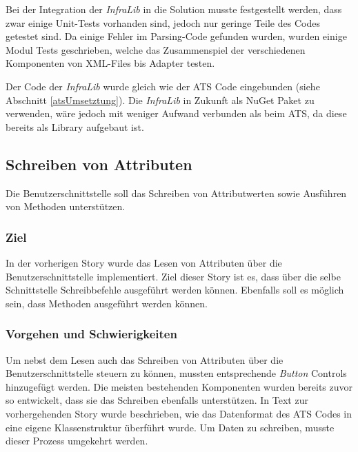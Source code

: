 Bei der Integration der \textit{InfraLib} in die Solution musste festgestellt werden, dass zwar einige Unit-Tests vorhanden sind, jedoch nur geringe Teile des Codes getestet sind.
Da einige Fehler im Parsing-Code gefunden wurden, wurden einige Modul Tests geschrieben, welche das Zusammenspiel der verschiedenen Komponenten von XML-Files bis Adapter testen.

Der Code der \textit{InfraLib} wurde gleich wie der \ac{ATS} Code eingebunden (siehe Abschnitt \ref{atsUmsetztung}).
Die \textit{InfraLib} in Zukunft als NuGet Paket zu verwenden, wäre jedoch mit weniger Aufwand verbunden als beim \ac{ATS}, da diese bereits als Library aufgebaut ist.

\subsection{Schreiben von Attributen}
\dq Die Benutzerschnittstelle soll das Schreiben von Attributwerten sowie Ausführen von Methoden unterstützen.\dq

\subsubsection{Ziel}
In der vorherigen Story wurde das Lesen von Attributen über die Benutzerschnittstelle implementiert.
Ziel dieser Story ist es, dass über die selbe Schnittstelle Schreibbefehle ausgeführt werden können.
Ebenfalls soll es möglich sein, dass Methoden ausgeführt werden können.

\subsubsection{Vorgehen und Schwierigkeiten}
Um nebst dem Lesen auch das Schreiben von Attributen über die Benutzerschnittstelle steuern zu können, mussten entsprechende \textit{Button} Controls hinzugefügt werden.
Die meisten bestehenden Komponenten wurden bereits zuvor so entwickelt, dass sie das Schreiben ebenfalls unterstützen.
In Text zur vorhergehenden Story wurde beschrieben, wie das Datenformat des \ac{ATS} Codes in eine eigene Klassenstruktur überführt wurde.
Um Daten zu schreiben, musste dieser Prozess umgekehrt werden.

